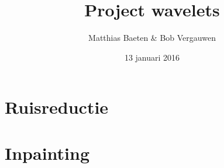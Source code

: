 

\title{Project wavelets}
\author{Matthias Baeten \& Bob Vergauwen}
\date{ 13 januari 2016}



\maketitle

\section{Ruisreductie}


\section{Inpainting}

